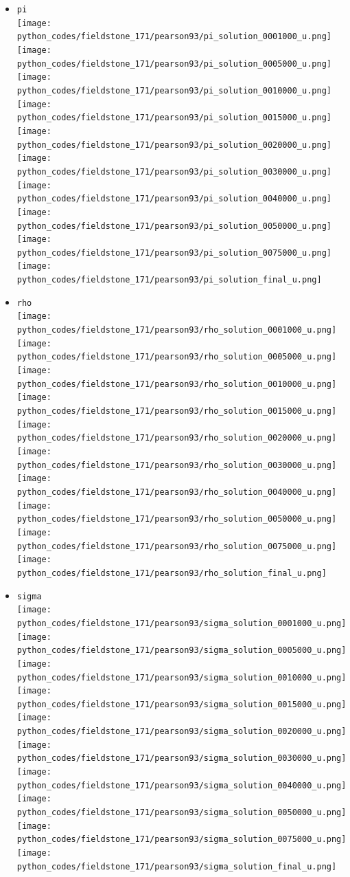 \begin{itemize}
\item {\tt pi}\\
\texttt{[image: python\_codes/fieldstone\_171/pearson93/pi\_solution\_0001000\_u.png]}
\texttt{[image: python\_codes/fieldstone\_171/pearson93/pi\_solution\_0005000\_u.png]}
\texttt{[image: python\_codes/fieldstone\_171/pearson93/pi\_solution\_0010000\_u.png]}
\texttt{[image: python\_codes/fieldstone\_171/pearson93/pi\_solution\_0015000\_u.png]}
\texttt{[image: python\_codes/fieldstone\_171/pearson93/pi\_solution\_0020000\_u.png]}\\
\texttt{[image: python\_codes/fieldstone\_171/pearson93/pi\_solution\_0030000\_u.png]}
\texttt{[image: python\_codes/fieldstone\_171/pearson93/pi\_solution\_0040000\_u.png]}
\texttt{[image: python\_codes/fieldstone\_171/pearson93/pi\_solution\_0050000\_u.png]}
\texttt{[image: python\_codes/fieldstone\_171/pearson93/pi\_solution\_0075000\_u.png]}
\texttt{[image: python\_codes/fieldstone\_171/pearson93/pi\_solution\_final\_u.png]}

\item {\tt rho}\\
\texttt{[image: python\_codes/fieldstone\_171/pearson93/rho\_solution\_0001000\_u.png]}
\texttt{[image: python\_codes/fieldstone\_171/pearson93/rho\_solution\_0005000\_u.png]}
\texttt{[image: python\_codes/fieldstone\_171/pearson93/rho\_solution\_0010000\_u.png]}
\texttt{[image: python\_codes/fieldstone\_171/pearson93/rho\_solution\_0015000\_u.png]}
\texttt{[image: python\_codes/fieldstone\_171/pearson93/rho\_solution\_0020000\_u.png]}\\
\texttt{[image: python\_codes/fieldstone\_171/pearson93/rho\_solution\_0030000\_u.png]}
\texttt{[image: python\_codes/fieldstone\_171/pearson93/rho\_solution\_0040000\_u.png]}
\texttt{[image: python\_codes/fieldstone\_171/pearson93/rho\_solution\_0050000\_u.png]}
\texttt{[image: python\_codes/fieldstone\_171/pearson93/rho\_solution\_0075000\_u.png]}
\texttt{[image: python\_codes/fieldstone\_171/pearson93/rho\_solution\_final\_u.png]}

\item {\tt sigma}\\
\texttt{[image: python\_codes/fieldstone\_171/pearson93/sigma\_solution\_0001000\_u.png]}
\texttt{[image: python\_codes/fieldstone\_171/pearson93/sigma\_solution\_0005000\_u.png]}
\texttt{[image: python\_codes/fieldstone\_171/pearson93/sigma\_solution\_0010000\_u.png]}
\texttt{[image: python\_codes/fieldstone\_171/pearson93/sigma\_solution\_0015000\_u.png]}
\texttt{[image: python\_codes/fieldstone\_171/pearson93/sigma\_solution\_0020000\_u.png]}\\
\texttt{[image: python\_codes/fieldstone\_171/pearson93/sigma\_solution\_0030000\_u.png]}
\texttt{[image: python\_codes/fieldstone\_171/pearson93/sigma\_solution\_0040000\_u.png]}
\texttt{[image: python\_codes/fieldstone\_171/pearson93/sigma\_solution\_0050000\_u.png]}
\texttt{[image: python\_codes/fieldstone\_171/pearson93/sigma\_solution\_0075000\_u.png]}
\texttt{[image: python\_codes/fieldstone\_171/pearson93/sigma\_solution\_final\_u.png]}


\end{itemize}
